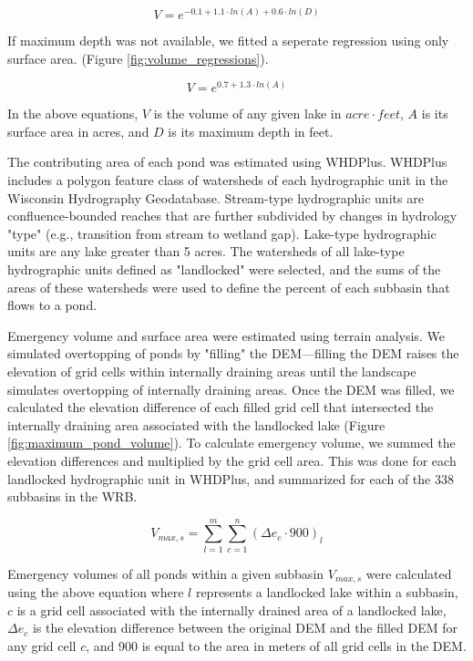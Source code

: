 \begin{equation}
V = e^{-0.1 + 1.1 \cdot ln(A) + 0.6 \cdot ln(D)} 
\end{equation}

If maximum depth was not available, we fitted a seperate regression using only surface area. (Figure \ref{fig:volume_regressions}).

\begin{equation}
V = e^{0.7 + 1.3 \cdot ln(A)} 
\end{equation}

In the above equations, $V$ is the volume of any given lake in $acre \cdot feet$, $A$ is its surface area in acres, and $D$ is its maximum depth in feet.

The contributing area of each pond was estimated using WHDPlus. WHDPlus includes a polygon feature class of watersheds of each hydrographic unit in the Wisconsin Hydrography Geodatabase. Stream-type hydrographic units are confluence-bounded reaches that are further subdivided by changes in hydrology "type" (e.g., transition from stream to wetland gap). Lake-type hydrographic units are any lake greater than 5 acres. The watersheds of all lake-type hydrographic units defined as "landlocked" were selected, and the sums of the areas of these watersheds were used to define the percent of each subbasin that flows to a pond.

Emergency volume and surface area were estimated using terrain analysis. We simulated overtopping of ponds by "filling" the DEM---filling the DEM raises the elevation of grid cells within internally draining areas until the landscape simulates overtopping of internally draining areas. Once the DEM was filled, we calculated the elevation difference of each filled grid cell that intersected the internally draining area associated with the landlocked lake (Figure \ref{fig:maximum_pond_volume}). To calculate emergency volume, we summed the elevation differences and multiplied by the grid cell area. This was done for each landlocked hydrographic unit in WHDPlus, and summarized for each of the 338 subbasins in the WRB.

\begin{equation}
V_{max,s} = \sum\limits_{l=1}^m \sum\limits_{c=1}^n (\Delta e_c \cdot 900)_l
\end{equation}

Emergency volumes of all ponds within a given subbasin $V_{max,s}$ were calculated using the above equation where $l$ represents a landlocked lake within a subbasin, $c$ is a grid cell associated with the internally drained area of a landlocked lake, $\Delta e_c$ is the elevation difference between the original DEM and the filled DEM for any grid cell $c$, and 900 is equal to the area in meters of all grid cells in the DEM.